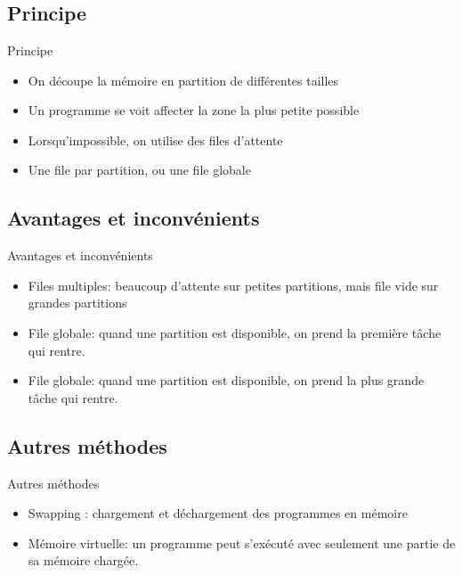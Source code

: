 \section{\sectitle}
\begin{frame}{\sectitle}
\def\subsectitle{Principe}
\subsection{\subsectitle}
\begin{block}{\subsectitle}
\begin{itemize}
    \item On découpe la mémoire en partition de différentes tailles
    \item Un programme se voit affecter la zone la plus petite possible
    \item Lorsqu'impossible, on utilise des files d'attente
    \item Une file par partition, ou une file globale
\end{itemize}
\end{block}

\def\subsectitle{Avantages et inconvénients}
\subsection{\subsectitle}
\begin{block}{\subsectitle}
\begin{itemize}
    \item Files multiples: beaucoup d'attente sur petites partitions, mais file
        vide sur grandes partitions
    \item File globale: quand une partition est disponible, on prend la première
        tâche qui rentre. 
    \item File globale: quand une partition est disponible, on prend la plus
        grande tâche qui rentre. 
\end{itemize}
\end{block}
\end{frame}


\begin{frame}{\sectitle}
    \def\subsectitle{Autres méthodes}
    \subsection{\subsectitle}
    \begin{block}{\subsectitle}
        \begin{itemize}
            \item Swapping : chargement et déchargement des programmes en
                mémoire
            \item Mémoire virtuelle: un programme peut s'exécuté avec seulement
                une partie de sa mémoire chargée.
        \end{itemize}
    \end{block}
\end{frame}


